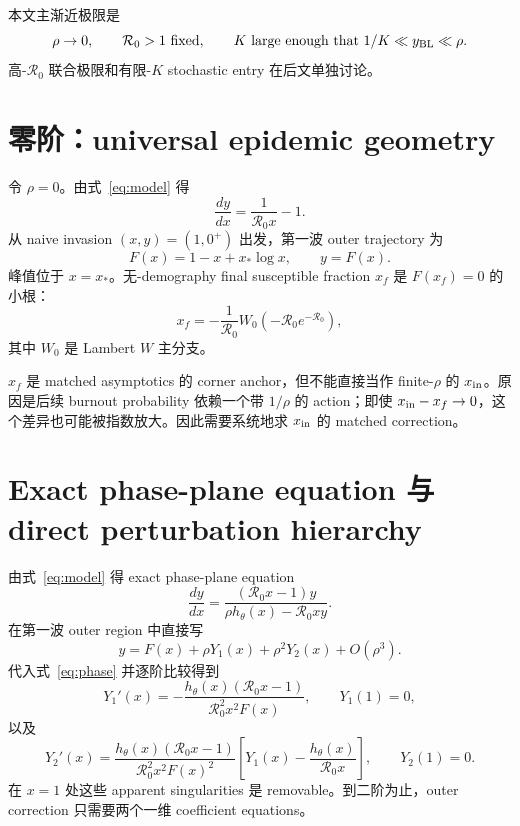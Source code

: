 \documentclass[11pt,a4paper]{ctexart}
\newcommand{\Rzero}{\mathcal R_0}
\newcommand{\BL}{y_{\rm BL}}
\newcommand{\xin}{x_{\rm in}}
\newcommand{\xf}{x_f}
\newcommand{\xs}{x_*}
\begin{document}
本文主渐近极限是
\begin{equation}
\label{eq:limit}
\rho\to0,
\qquad \Rzero>1\ \text{fixed},
\qquad K\ \text{large enough that }1/K\ll\BL\ll\rho.
\end{equation}
高-$\Rzero$ 联合极限和有限-$K$ stochastic entry 在后文单独讨论。

\section{零阶：universal epidemic geometry}
令 $\rho=0$。由式~\eqref{eq:model} 得
\[
\frac{dy}{dx}=\frac1{\Rzero x}-1.
\]
从 naive invasion $(x,y)=(1,0^+)$ 出发，第一波 outer trajectory 为
\begin{equation}
\label{eq:F}
F(x)=1-x+\xs\log x,
\qquad y=F(x).
\end{equation}
峰值位于 $x=\xs$。无-demography final susceptible fraction $\xf$ 是 $F(\xf)=0$ 的小根：
\begin{equation}
\label{eq:xf}
\xf=-\frac1{\Rzero}W_0(-\Rzero e^{-\Rzero}),
\end{equation}
其中 $W_0$ 是 Lambert $W$ 主分支。

$\xf$ 是 matched asymptotics 的 corner anchor，但不能直接当作 finite-$\rho$ 的 $\xin$。原因是后续 burnout probability 依赖一个带 $1/\rho$ 的 action；即使 $\xin-\xf\to0$，这个差异也可能被指数放大。因此需要系统地求 $\xin$ 的 matched correction。

\section{Exact phase-plane equation 与 direct perturbation hierarchy}
由式~\eqref{eq:model} 得 exact phase-plane equation
\begin{equation}
\label{eq:phase}
\frac{dy}{dx}
=\frac{(\Rzero x-1)y}{\rho h_\theta(x)-\Rzero xy}.
\end{equation}
在第一波 outer region 中直接写
\begin{equation}
\label{eq:Yexp}
y=F(x)+\rho Y_1(x)+\rho^2Y_2(x)+O(\rho^3).
\end{equation}
代入式~\eqref{eq:phase} 并逐阶比较得到
\begin{equation}
\label{eq:Y1}
Y_1'(x)
=-\frac{h_\theta(x)(\Rzero x-1)}{\Rzero^2x^2F(x)},
\qquad Y_1(1)=0,
\end{equation}
以及
\begin{equation}
\label{eq:Y2}
Y_2'(x)
=\frac{h_\theta(x)(\Rzero x-1)}{\Rzero^2x^2F(x)^2}
\left[Y_1(x)-\frac{h_\theta(x)}{\Rzero x}\right],
\qquad Y_2(1)=0.
\end{equation}
在 $x=1$ 处这些 apparent singularities 是 removable。到二阶为止，outer correction 只需要两个一维 coefficient equations。
\end{document}
